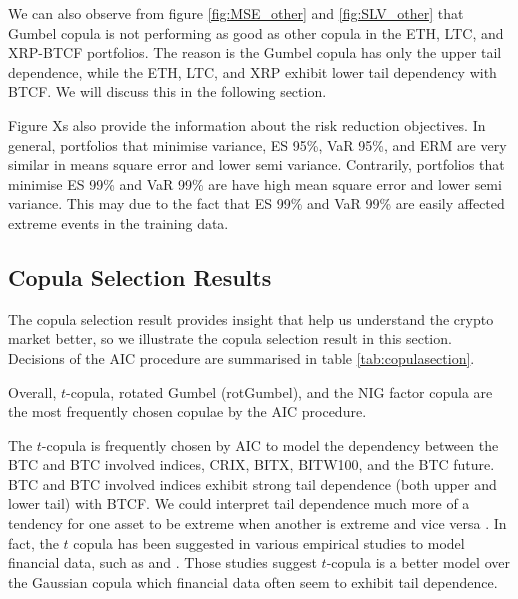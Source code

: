 We can also observe from figure \ref{fig:MSE_other} and \ref{fig:SLV_other} that Gumbel copula is not performing as good as other copula in the ETH, LTC, and XRP-BTCF portfolios.
The reason is the Gumbel copula has only the upper tail dependence, while the ETH, LTC, and XRP exhibit lower tail dependency with BTCF.
We will discuss this in the following section. \medskip

Figure Xs also provide the information about the risk reduction objectives.
In general, portfolios that minimise variance, ES 95\%, VaR 95\%, and ERM are very similar in means square error and lower semi variance.
Contrarily, portfolios that minimise ES 99\% and VaR 99\% are have high mean square error and lower semi variance.
This may due to the fact that ES 99\% and VaR 99\% are easily affected extreme events in the training data. \medskip

\subsection{Copula Selection Results}\label{sec: copula results}
The copula selection result provides insight that help us understand the crypto market better, so
we illustrate the copula selection result in this section.
Decisions of the AIC procedure are summarised in table \ref{tab:copulasection}. \medskip

Overall, $t$-copula, rotated Gumbel (rotGumbel), and the NIG factor copula are the most frequently chosen copulae by the AIC procedure. \medskip

The $t$-copula is frequently chosen by AIC to model the dependency between the BTC and BTC involved indices, CRIX, BITX, BITW100, and the BTC future.
BTC and BTC involved indices exhibit strong tail dependence (both upper and lower tail) with BTCF.
We could interpret tail dependence much more of a tendency for one asset to be extreme when another is extreme and vice versa \citep{McNeil2015}.
In fact, the $t$ copula has been suggested in various empirical studies to model financial data, such as \cite{zeevi2002beyond} and \cite{breymann2003dependence}.
Those studies suggest $t$-copula is a better model over the Gaussian copula which financial data often seem to exhibit tail dependence. \medskip

